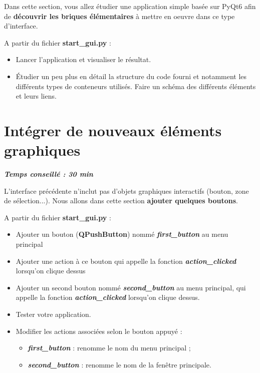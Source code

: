 \documentclass[a4paper,11pt,titlepage]{article} %
\begin{document}
Dans cette section, vous allez étudier une application simple basée sur PyQt6 afin de \textbf{découvrir les briques élémentaires} à mettre en oeuvre dans ce type d'interface.

\medskip

A partir du fichier \textbf{start\_gui.py} :

\begin{itemize}
	\item Lancer l'application et visualiser le résultat.
	\item Étudier un peu plus en détail la structure du code fourni et notamment les différents types de conteneurs utilisés. Faire un schéma des différents éléments et leurs liens.
\end{itemize}
	

\section{Intégrer de nouveaux éléments graphiques}		

\begin{center} \textbf{\textit{Temps conseillé : 30 min}} \end{center}

L'interface précédente n'inclut pas d'objets graphiques interactifs (bouton, zone de sélection...). Nous allons dans cette section \textbf{ajouter quelques boutons}.

A partir du fichier \textbf{start\_gui.py} :

\begin{itemize}
	\item Ajouter un bouton (\textbf{QPushButton}) nommé \textsl{\textbf{first\_button}} au menu principal
	\item Ajouter une action à ce bouton qui appelle la fonction \textsl{\textbf{action\_clicked}} lorsqu'on clique dessus
	\item Ajouter un second bouton nommé \textsl{\textbf{second\_button}} au menu principal, qui appelle la fonction \textsl{\textbf{action\_clicked}} lorsqu'on clique dessus.
	\item Tester votre application.
	
	\medskip	
	
	\item Modifier les actions associées selon le bouton appuyé :
	\begin{itemize}
		\item \textsl{\textbf{first\_button}} : renomme le nom du menu principal ;
		\item \textsl{\textbf{second\_button}} : renomme le nom de la fenêtre principale.
	\end{itemize}
\end{itemize}
\end{document}
